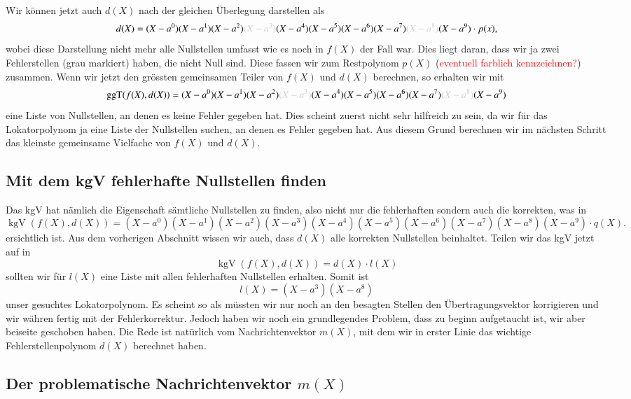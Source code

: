 Wir können jetzt auch $d(X)$ nach der gleichen Überlegung darstellen als 
\[
d(X) = (X-a^0)(X-a^1)(X-a^2)\textcolor{gray!40}{(X-a^3)}(X-a^4)(X-a^5)(X-a^6)(X-a^7)\textcolor{gray!40}{(X-a^8)}(X-a^9) \cdot p(x),
\]
wobei diese Darstellung nicht mehr alle Nullstellen umfasst wie es noch in $f(X)$ der Fall war. 
Dies liegt daran, dass wir ja zwei Fehlerstellen (grau markiert) haben, die nicht Null sind. Diese fassen wir zum Restpolynom $p(X)$ (\textcolor{red}{eventuell farblich kennzeichnen?}) zusammen.
Wenn wir jetzt den grössten gemeinsamen Teiler von $f(X)$ und $d(X)$ berechnen, so erhalten wir mit 
\[
\operatorname{ggT}(f(X),d(X)) = (X-a^0)(X-a^1)(X-a^2)\textcolor{gray!40}{(X-a^3)}(X-a^4)(X-a^5)(X-a^6)(X-a^7)\textcolor{gray!40}{(X-a^8)}(X-a^9)
\]
eine Liste von Nullstellen, an denen es keine Fehler gegeben hat.
Dies scheint zuerst nicht sehr hilfreich zu sein, da wir für das Lokatorpolynom ja eine Liste der Nullstellen suchen, an denen es Fehler gegeben hat. Aus diesem Grund berechnen wir im nächsten Schritt das kleinste gemeinsame Vielfache von $f(X)$ und $d(X)$. 


\subsection{Mit dem kgV fehlerhafte Nullstellen finden
	\label{reedsolomon:subsection:kgV}}

Das kgV hat nämlich die Eigenschaft sämtliche Nullstellen zu finden, also nicht nur die fehlerhaften sondern auch die korrekten, was in 
\[
\operatorname{kgV}(f(X),d(X)) = (X-a^0)(X-a^1)(X-a^2)(X-a^3)(X-a^4)(X-a^5)(X-a^6)(X-a^7)(X-a^8)(X-a^9) \cdot q(X).
\]
ersichtlich ist.
Aus dem vorherigen Abschnitt wissen wir auch, dass $d(X)$ alle korrekten Nullstellen beinhaltet. Teilen wir das kgV jetzt auf in 
\[
\operatorname{kgV}(f(X),d(X)) = d(X) \cdot l(X)
\]
sollten wir für $l(X)$ eine Liste mit allen fehlerhaften Nullstellen erhalten.
Somit ist 
\[
l(X) = (X-a^3)(X-a^8)
\]
unser gesuchtes Lokatorpolynom. 
Es scheint so als müssten wir nur noch an den besagten Stellen den Übertragungsvektor korrigieren und wir währen fertig mit der Fehlerkorrektur.
Jedoch haben wir noch ein grundlegendes Problem, dass zu beginn aufgetaucht ist, wir aber beiseite geschoben haben. Die Rede ist natürlich vom Nachrichtenvektor $m(X)$, mit dem wir in erster Linie das wichtige Fehlerstellenpolynom $d(X)$ berechnet haben.

\subsection{Der problematische Nachrichtenvektor $m(X)$
	\label{reedsolomon:subsection:nachrichtenvektor}}

